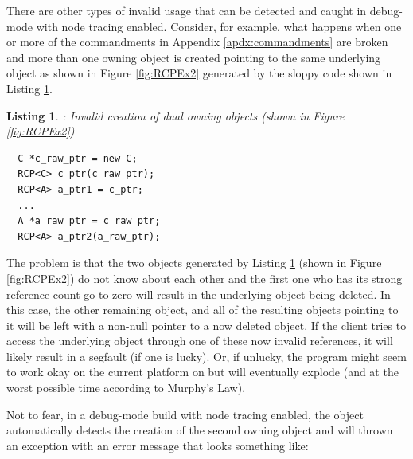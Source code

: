 \documentclass[pdf,ps2pdf,11pt]{SANDreport}
\newtheorem{listing}{Listing}
\begin{document}
There are other types of invalid usage that can be detected and caught
in debug-mode with node tracing enabled.  Consider, for example, what
happens when one or more of the commandments in Appendix
{}\ref{apdx:commandments} are broken and more than one owning
{} object is created pointing to the same underlying
{} object as shown in Figure {}\ref{fig:RCPEx2}
generated by the sloppy code shown in Listing
{}\ref{listing:duplicate_owning_rcp}.


{}\begin{listing}: Invalid creation of dual owning {}
objects (shown in Figure {}\ref{fig:RCPEx2})
\label{listing:duplicate_owning_rcp}
{\small\begin{verbatim}
  C *c_raw_ptr = new C;
  RCP<C> c_ptr(c_raw_ptr);
  RCP<A> a_ptr1 = c_ptr;
  ...
  A *a_raw_ptr = c_raw_ptr;
  RCP<A> a_ptr2(a_raw_ptr);
\end{verbatim}}
\end{listing}


The problem is that the two {} objects generated by
Listing {}\ref{listing:duplicate_owning_rcp} (shown in Figure
{}\ref{fig:RCPEx2}) do not know about each other and the first one who
has its strong reference count go to zero will result in the
underlying {} object being deleted.  In this case, the other
remaining {} object, and all of the resulting
{} objects pointing to it will be left with a non-null
pointer to a now deleted {} object.  If the client tries to
access the underlying object through one of these now invalid
references, it will likely result in a segfault (if one is lucky).
Or, if unlucky, the program might seem to work okay on the current
platform on but will eventually explode (and at the worst possible
time according to Murphy's Law).

Not to fear, in a debug-mode build with node tracing enabled, the
{} object automatically detects the creation of
the second owning {} object and will thrown an
exception with an error message that looks something like:
\end{document}
